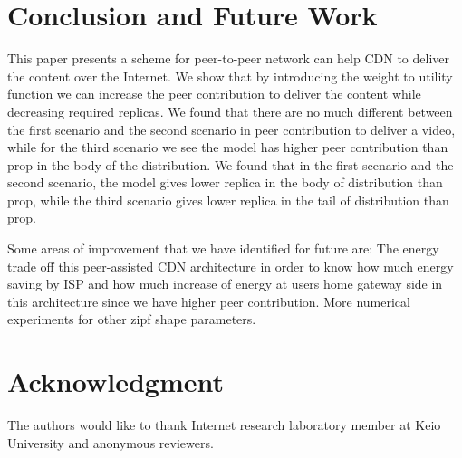\documentclass[10pt,final,journal,a4paper]{IEEEtran}
\begin{document}
\section{Conclusion and Future Work}\label{conclusion}
This paper presents a scheme for peer-to-peer network can help CDN to deliver the content over the Internet. 
We show that by introducing the weight to utility function we can increase the peer contribution to deliver the content while decreasing required replicas. 
We found that there are no much different between the first scenario and the second scenario in peer contribution to deliver a video, while for the third scenario we see the model has higher peer contribution than prop in the body of the distribution.
We found that in the first scenario and the second scenario, the model gives lower replica in the body of distribution than prop, while the third scenario gives lower replica in the tail of distribution than prop.

Some areas of improvement that we have identified for future are:
The energy trade off this peer-assisted CDN architecture in order to know how much energy saving by ISP and how much increase of energy at users home gateway side in this architecture since we have higher peer contribution.   
More numerical experiments for other zipf shape parameters. 


\section*{Acknowledgment}
The authors would like to thank Internet research laboratory member at Keio University and anonymous reviewers.







%
%
%



\end{document}

